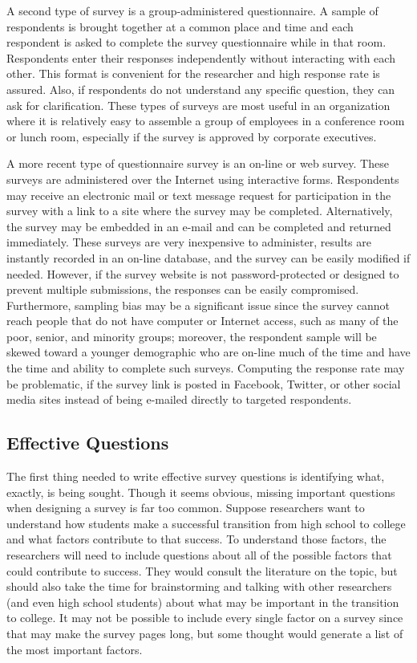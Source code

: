 A second type of survey is a group-administered questionnaire. A sample of respondents is brought together at a common place and time and each respondent is asked to complete the survey questionnaire while in that room. Respondents enter their responses independently without interacting with each other. This format is convenient for the researcher and high response rate is assured. Also, if respondents do not understand any specific question, they can ask for clarification. These types of surveys are most useful in an organization where it is relatively easy to assemble a group of employees in a conference room or lunch room, especially if the survey is approved by corporate executives.

A more recent type of questionnaire survey is an on-line or web survey. These surveys are administered over the Internet using interactive forms. Respondents may receive an electronic mail or text message request for participation in the survey with a link to a site where the survey may be completed. Alternatively, the survey may be embedded in an e-mail and can be completed and returned immediately. These surveys are very inexpensive to administer, results are instantly recorded in an on-line database, and the survey can be easily modified if needed. However, if the survey website is not password-protected or designed to prevent multiple submissions, the responses can be easily compromised. Furthermore, sampling bias may be a significant issue since the survey cannot reach people that do not have computer or Internet access, such as many of the poor, senior, and minority groups; moreover, the respondent sample will be skewed toward a younger demographic who are on-line much of the time and have the time and ability to complete such surveys. Computing the response rate may be problematic, if the survey link is posted in Facebook, Twitter, or other social media sites instead of being e-mailed directly to targeted respondents. 

\subsection{Effective Questions}

The first thing needed to write effective survey questions is identifying what, exactly, is being sought. Though it seems obvious, missing important questions when designing a survey is far too common. Suppose researchers want to understand how students make a successful transition from high school to college and what factors contribute to that success. To understand those factors, the researchers will need to include questions about all of the possible factors that could contribute to success. They would consult the literature on the topic, but should also take the time for brainstorming and talking with other researchers (and even high school students) about what may be important in the transition to college. It may not be possible to include every single factor on a survey since that may make the survey pages long, but some thought would generate a list of the most important factors.

